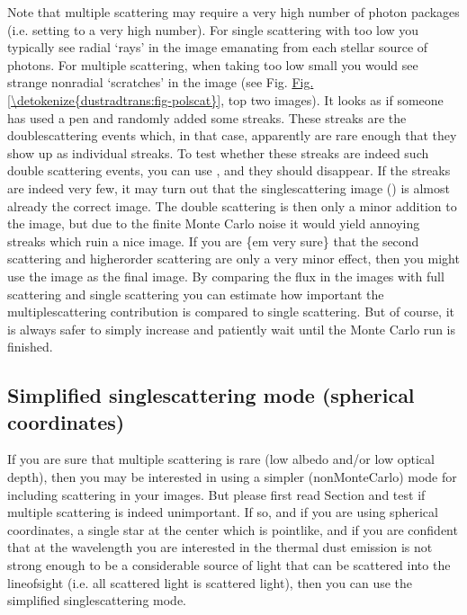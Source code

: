 \documentclass[letterpaper,10pt,english]{sphinxmanual}
\begin{document}
Note that multiple scattering may require a very high number of photon packages
(i.e. setting  to a very high number). For single scattering with
too low  you typically see radial ‘rays’ in the image emanating
from each stellar source of photons. For multiple scattering, when taking too
low  small you would see strange non\sphinxhyphen{}radial ‘scratches’ in the
image (see Fig. \hyperref[\detokenize{dustradtrans:fig-polscat}]{Fig.\@ \ref{\detokenize{dustradtrans:fig-polscat}}}, top two images). It looks as if someone has
used a pen and randomly added some streaks. These streaks are the
double\sphinxhyphen{}scattering events which, in that case, apparently are rare enough that
they show up as individual streaks. To test whether these streaks are indeed
such double scattering events, you can use , and they should
disappear. If the streaks are indeed very few, it may turn out that the
single\sphinxhyphen{}scattering image () is almost already the correct
image. The double scattering is then only a minor addition to the image, but due
to the finite Monte Carlo noise it would yield annoying streaks which ruin a
nice image. If you are \{em very sure\} that the second scattering and
higher\sphinxhyphen{}order scattering are only a very minor effect, then you might use the
 image as the final image. By comparing the flux in the images
with full scattering and single scattering you can estimate how important the
multiple\sphinxhyphen{}scattering contribution is compared to single scattering. But of
course, it is always safer to simply increase  and patiently wait
until the Monte Carlo run is finished.


\subsection{Simplified single\sphinxhyphen{}scattering mode (spherical coordinates)}
\label{\detokenize{dustradtrans:simplified-single-scattering-mode-spherical-coordinates}}\label{\detokenize{dustradtrans:sec-simple-single-scattering}}
If you are sure that multiple scattering is rare (low albedo and/or low optical
depth), then you may be interested in using a simpler (non\sphinxhyphen{}Monte\sphinxhyphen{}Carlo) mode for
including scattering in your images.  But please first read Section
{\hyperref[\detokenize{dustradtrans:sec-single-multiple-scattering}]{}} and test if multiple scattering is indeed
unimportant. If so, and if you are using spherical coordinates, a single star at
the center which is point\sphinxhyphen{}like, and if you are confident that at the wavelength
you are interested in the thermal dust emission is not strong enough to be a
considerable source of light that can be scattered into the line\sphinxhyphen{}of\sphinxhyphen{}sight
(i.e. all scattered light is scattered  light), then you can use the
simplified single\sphinxhyphen{}scattering mode.
\end{document}
